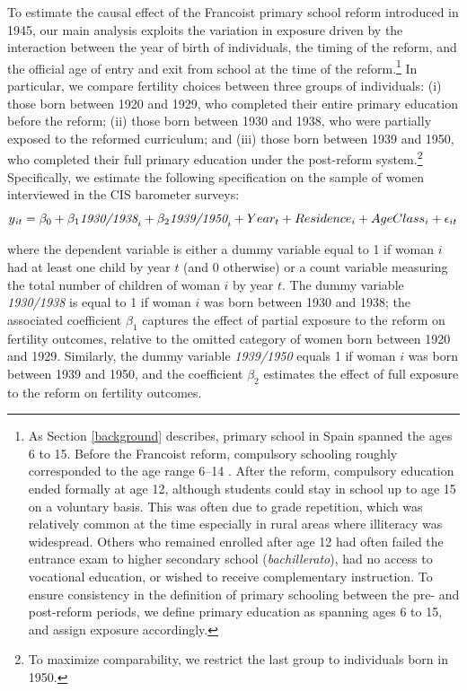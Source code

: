 \documentclass[a4paper,oneside,final,onecolumn,12pt,english]{article}
\begin{document}
To estimate the causal effect of the Francoist primary school reform introduced in 1945, our main analysis exploits the variation in exposure driven by the interaction between the year of birth of individuals, the timing of the reform, and the official age of entry and exit from school at the time of the reform.\footnote{As Section \ref{background} describes, primary school in Spain spanned the ages 6 to 15. Before the Francoist reform, compulsory schooling roughly corresponded to the age range 6–14 \citep[][]{rd1923}. After the reform, compulsory education ended formally at age 12, although students could stay in school up to age 15 on a voluntary basis. This was often due to grade repetition, which was relatively common at the time especially in rural areas where illiteracy was widespread. Others who remained enrolled after age 12 had often failed the entrance exam to higher secondary school (\textit{bachillerato}), had no access to vocational education, or wished to receive complementary instruction. To ensure consistency in the definition of primary schooling between the pre- and post-reform periods, we define primary education as spanning ages 6 to 15, and assign exposure accordingly.} In particular, we compare fertility choices between three groups of individuals: (i) those born between 1920 and 1929, who completed their entire primary education before the reform; (ii) those born between 1930 and 1938, who were partially exposed to the reformed curriculum; and (iii) those born between 1939 and 1950, who completed their full primary education under the post-reform system.\footnote{To maximize comparability, we restrict the last group to individuals born in 1950.} Specifically, we estimate the following specification on the sample of women interviewed in the CIS barometer surveys:
 \begin{equation}\label{eq_individual}
y_{\text{\textit{it}}} =\beta_0+  \beta_1  \textit{1930/1938}_i + \beta_2 \textit{1939/1950}_i +Year_{t} +Residence_{i} +AgeClass_{i}  +\epsilon_{it}
\end{equation}


where the dependent variable is either a dummy variable equal to 1 if woman $i$ had at least one child by year $t$ (and 0 otherwise) or a count variable measuring the total number of children of woman $i$ by year $t$. The dummy variable \textit{1930/1938} is equal to 1 if woman $i$ was born between 1930 and 1938; the associated coefficient $\beta_1$ captures the effect of partial exposure to the reform on fertility outcomes, relative to the omitted category of women born between 1920 and 1929. Similarly, the dummy variable \textit{1939/1950} equals 1 if woman $i$ was born between 1939 and 1950, and the coefficient $\beta_2$ estimates the effect of full exposure to the reform on fertility outcomes.
\end{document}
